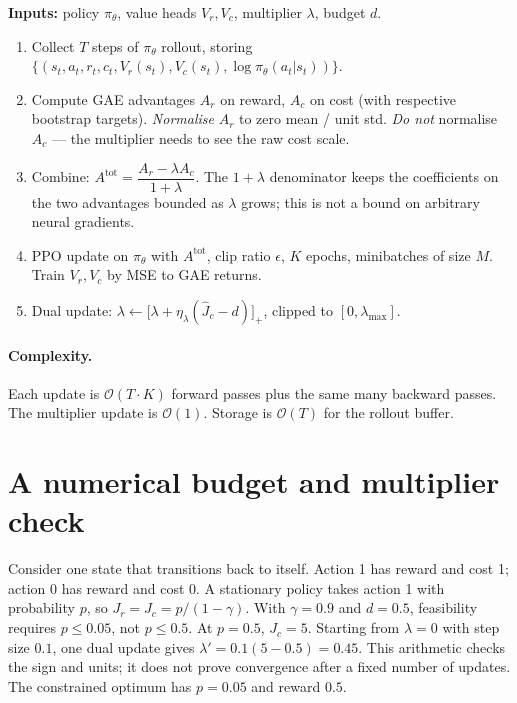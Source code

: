 \documentclass[11pt,oneside]{scrbook}
\begin{document}
\begin{tcolorbox}[colback=mintedbg, colframe=rlgray!50, title=\textbf{Algorithm: PPO-Lagrangian (one update)}]
\textbf{Inputs:} policy $\pi_\theta$, value heads $V_r, V_c$, multiplier $\lambda$, budget $d$.

\begin{enumerate}[leftmargin=*]
  \item Collect $T$ steps of $\pi_\theta$ rollout, storing
        $\{(s_t, a_t, r_t, c_t, V_r(s_t), V_c(s_t), \log\pi_\theta(a_t|s_t))\}$.
  \item Compute GAE advantages $A_r$ on reward, $A_c$ on cost (with respective
        bootstrap targets). \emph{Normalise} $A_r$ to zero mean / unit std.
        \emph{Do not} normalise $A_c$ --- the multiplier needs to see the raw
        cost scale.
  \item Combine: $A^{\text{tot}} = \dfrac{A_r - \lambda A_c}{1 + \lambda}$. The
        $1+\lambda$ denominator keeps the coefficients on the two advantages bounded as $\lambda$ grows; this is not a bound on arbitrary neural gradients.
  \item PPO update on $\pi_\theta$ with $A^{\text{tot}}$, clip ratio $\epsilon$,
        $K$ epochs, minibatches of size $M$. Train $V_r, V_c$ by MSE to GAE
        returns.
  \item Dual update: $\lambda \leftarrow \bigl[\lambda + \eta_\lambda (\hat J_c - d)\bigr]_+$, clipped to $[0, \lambda_{\max}]$.
\end{enumerate}
\end{tcolorbox}

\paragraph{Complexity.} Each update is $\mathcal{O}(T \cdot K)$ forward
passes plus the same many backward passes. The multiplier update is
$\mathcal{O}(1)$. Storage is $\mathcal{O}(T)$ for the rollout buffer.

\section{A numerical budget and multiplier check}
Consider one state that transitions back to itself. Action 1 has reward and
cost 1; action 0 has reward and cost 0. A stationary policy takes action 1
with probability $p$, so $J_r=J_c=p/(1-\gamma)$. With $\gamma=0.9$ and
$d=0.5$, feasibility requires $p\leq0.05$, not $p\leq0.5$.
At $p=0.5$, $J_c=5$. Starting from $\lambda=0$ with step size $0.1$, one
dual update gives $\lambda'=0.1(5-0.5)=0.45$. This arithmetic checks the
sign and units; it does not prove convergence after a fixed number of
updates. The constrained optimum has $p=0.05$ and reward $0.5$.
\end{document}
